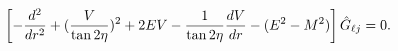 \begin{equation}
\left[-{d^2\over dr^2}+({V\over \tan 2\eta})^2+2EV-
{1\over \tan 2\eta}{dV\over dr}-
(E^2-M^2)\right]\hat G_{\ell j}=0.
\end{equation}

